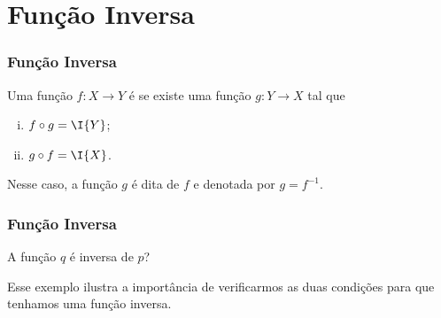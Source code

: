 \section{Função Inversa}
\begin{frame}
\frametitle{Função Inversa} 

\begin{definicao}\label{funinv}
Uma função $f: X \to Y$ é  se existe uma função $g:
Y \to X$ tal que
\begin{enumerate}[(i)]
	\item $f \circ g = \I{Y}$;
	\item $g \circ f = \I{X}$.
\end{enumerate}
Nesse caso, a função $g$ é dita  de $f$ e
denotada por $g = f^{-1}$.
\end{definicao}

\end{frame}





\begin{frame}
\frametitle{Função Inversa} 

\begin{exemplo}
A função $q$ é inversa de $p$?
\end{exemplo}\pause
 Esse exemplo ilustra a importância de verificarmos as duas
 condições para que tenhamos uma função inversa.

\end{frame}
